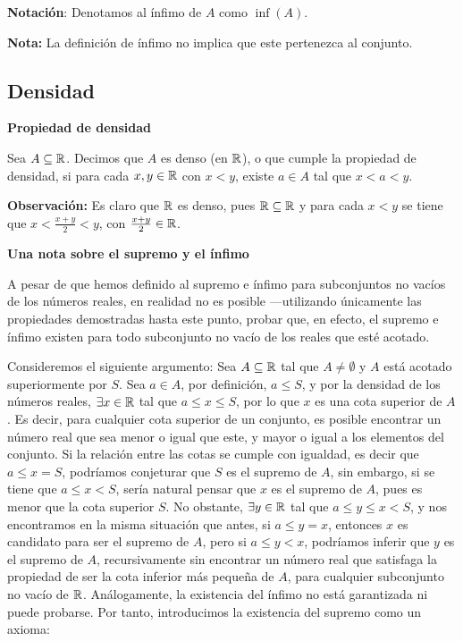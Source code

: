 \textbf{Notación}: Denotamos al ínfimo de $A$ como $\inf(A)$.

\textbf{Nota:} La definición de ínfimo no implica que este pertenezca al conjunto.

\subsection*{Densidad}

\textbf{Propiedad de densidad}

 Sea $A\subseteq \mathbb{R}$. Decimos que $A$ es denso (en $\mathbb{R}$), o que cumple la propiedad de densidad, si para cada $x,y \in \mathbb{R}$ con $x<y$, existe $a\in A$ tal que $x<a<y$.

\textbf{Observación:} Es claro que $\mathbb{R}$ es denso, pues $\mathbb{R}\subseteq \mathbb{R}$ y para cada $x<y$ se tiene que $x<\frac{x+y}{2}<y$, con $\frac{x+y}{2}\in \mathbb{R}$.

\textbf{Una nota sobre el supremo y el ínfimo}

A pesar de que hemos definido al supremo e ínfimo para subconjuntos no vacíos de los números reales, en realidad no es posible ---utilizando únicamente las propiedades demostradas hasta este punto, probar que, en efecto, el supremo e ínfimo existen para todo subconjunto no vacío de los reales que esté acotado.

Consideremos el siguiente argumento: Sea $A\subseteq \mathbb{R}$ tal que $A\neq \emptyset$ y $A$ está acotado superiormente por $S$. Sea $a\in A$, por definición, $a\leq S$, y por la densidad de los números reales, $\exists x\in \mathbb{R}$ tal que $a\leq x \leq S$, por lo que $x$ es una cota superior de $A$. Es decir, para cualquier cota superior de un conjunto, es posible encontrar un número real que sea menor o igual que este, y mayor o igual a los elementos del conjunto. Si la relación entre las cotas se cumple con igualdad, es decir que $a\leq x = S$, podríamos conjeturar que $S$ es el supremo de $A$, sin embargo, si se tiene que $a\leq x < S$, sería natural pensar que $x$ es el supremo de $A$, pues es menor que la cota superior $S$. No obstante, $\exists y\in \mathbb{R}$ tal que $a\leq y \leq x<S$, y nos encontramos en la misma situación que antes, si $a\leq y = x$, entonces $x$ es candidato para ser el supremo de $A$, pero si $a\leq y < x$, podríamos inferir que $y$ es el supremo de $A$, recursivamente sin encontrar un número real que satisfaga la propiedad de ser la cota inferior más pequeña de $A$, para cualquier subconjunto no vacío de $\mathbb{R}$. Análogamente, la existencia del ínfimo no está garantizada ni puede probarse. Por tanto, introducimos la existencia del supremo como un axioma:



